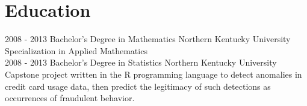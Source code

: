 \documentclass[]{moak-resume}
\begin{document}
\section{Education}
\begin{entrylist}
  \entry
    {2008 - 2013}
    {Bachelor's Degree in Mathematics}
    {Northern Kentucky University}
    {Specialization in Applied Mathematics\\}
  \entry
    {2008 - 2013}
    {Bachelor's Degree in Statistics}
    {Northern Kentucky University}
    {Capstone project written in the R programming language to detect anomalies in credit card usage data, then predict the legitimacy of such detections as occurrences of fraudulent behavior.\\}
\end{entrylist}
\\
\end{document}
